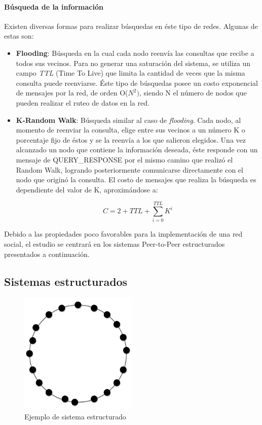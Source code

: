 \paragraph{Búsqueda de la información}
\label{sec:p2p_unstructured_search}
Existen diversas formas para realizar búsquedas en éste tipo de redes. Algunas
de estas son:
\begin{itemize}
    \item \textbf{Flooding}: Búsqueda en la cual cada nodo reenvía las
consultas que recibe a todos sus vecinos. Para no generar una saturación del
sistema, se utiliza un campo \textit{TTL} (Time To Live) que limita la cantidad
de veces que la misma consulta puede reenviarse. Éste tipo de búsquedas posee
un costo exponencial de mensajes por la red, de orden O($N^2)$, siendo N el
número de nodos que pueden realizar el ruteo de datos en la red.
    \item \textbf{K-Random Walk}: Búsqueda similar al caso de
\textit{flooding}. Cada nodo, al momento de reenviar la consulta, elige entre sus vecinos a un número K o porcentaje
fijo de éstos y se la reenvía a los que salieron elegidos. Una vez alcanzado un
nodo que contiene la información deseada, éste responde con un mensaje de
QUERY\_RESPONSE por el mismo camino que realizó el Random Walk, logrando
posteriormente comunicarse directamente con el nodo que originó la consulta.
El costo de mensajes que realiza la búsqueda es dependiente del valor de K,
aproximándose a: %

\begin{equation}
\label{eq:krandomwalk}
 C = 2 + TTL +
\sum_{i=0}^{TTL} K^i
\end{equation}

\end{itemize}


Debido a las propiedades poco favorables para la implementación de una red
social, el estudio se centrará en los sistemas Peer-to-Peer estructurados
presentados a continuación.

\subsection{Sistemas estructurados}
\label{sec:p2p_estructured}

\begin{figure}
\center
\includegraphics[width=0.5\textwidth]{img/p2p-structured}
\caption{Ejemplo de sistema estructurado}
\label{fig:p2p_estructured}
\end{figure}


